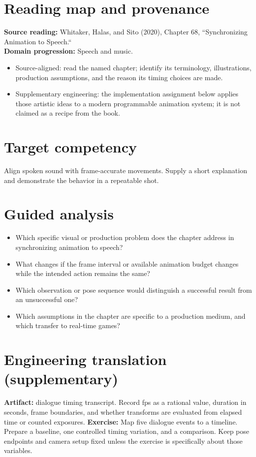 \documentclass[10pt,letterpaper]{article}
\begin{document}
\makedoctitle
\makedocsummary

\section{Reading map and provenance}
\textbf{Source reading:} Whitaker, Halas, and Sito (2020), Chapter 68, ``Synchronizing Animation to Speech.``\\
\textbf{Domain progression:} Speech and music.
\begin{itemize}
\item Source-aligned: read the named chapter; identify its terminology, illustrations, production assumptions, and the reason its timing choices are made.
\item Supplementary engineering: the implementation assignment below applies those artistic ideas to a modern programmable animation system; it is not claimed as a recipe from the book.
\end{itemize}
\section{Target competency}
Align spoken sound with frame-accurate movements. Supply a short explanation and demonstrate the behavior in a repeatable shot.
\section{Guided analysis}
\begin{itemize}
\item Which specific visual or production problem does the chapter address in synchronizing animation to speech?
\item What changes if the frame interval or available animation budget changes while the intended action remains the same?
\item Which observation or pose sequence would distinguish a successful result from an unsuccessful one?
\item Which assumptions in the chapter are specific to a production medium, and which transfer to real-time games?
\end{itemize}
\section{Engineering translation (supplementary)}
\textbf{Artifact:} dialogue timing transcript. Record fps as a rational value, duration in seconds, frame boundaries, and whether transforms are evaluated from elapsed time or counted exposures.
\textbf{Exercise:} Map five dialogue events to a timeline. Prepare a baseline, one controlled timing variation, and a comparison. Keep pose endpoints and camera setup fixed unless the exercise is specifically about those variables.
\end{document}
